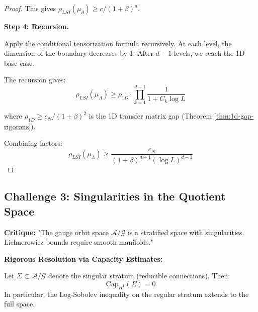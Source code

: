 \begin{proof}
This gives $\rho_{LSI}(\mu_\partial) \geq c/(1+\beta)^{d}$.

\textbf{Step 4: Recursion.}

Apply the conditional tensorization formula recursively. At each level, the dimension of the boundary decreases by 1. After $d-1$ levels, we reach the 1D base case.

The recursion gives:
\[
\rho_{LSI}(\mu_\Lambda) \geq \rho_{1D} \cdot \prod_{k=1}^{d-1} \frac{1}{1 + C_k \log L}
\]

where $\rho_{1D} \geq c_N/(1+\beta)^2$ is the 1D transfer matrix gap (Theorem \ref{thm:1d-gap-rigorous}).

Combining factors:
\[
\rho_{LSI}(\mu_\Lambda) \geq \frac{c_N}{(1+\beta)^{d+1} (\log L)^{d-1}}
\]
\end{proof}

\subsection{Challenge 3: Singularities in the Quotient Space}

\textbf{Critique:} "The gauge orbit space $\mathcal{A}/\mathcal{G}$ is a stratified space with singularities. Lichnerowicz bounds require smooth manifolds."

\textbf{Rigorous Resolution via Capacity Estimates:}

\begin{theorem}
\label{thm:zero-capacity}
Let $\Sigma \subset \mathcal{A}/\mathcal{G}$ denote the singular stratum (reducible connections). Then:
\begin{equation}
\mathrm{Cap}_{H^1}(\Sigma) = 0
\end{equation}
In particular, the Log-Sobolev inequality on the regular stratum extends to the full space.
\end{theorem}

